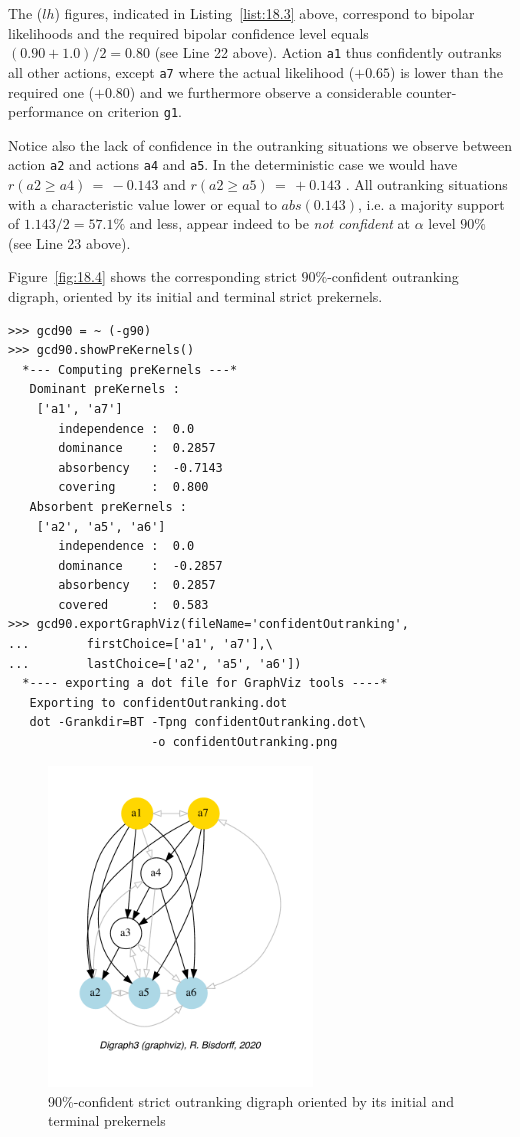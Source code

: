 The ($lh$) figures, indicated in Listing~\ref{list:18.3} above, correspond to bipolar likelihoods and the required bipolar confidence level equals $(0.90+1.0)/2 = 0.80$ (see Line 22 above). Action \texttt{a1} thus confidently outranks all other actions, except \texttt{a7} where the actual likelihood ($+0.65$) is lower than the required one ($+0.80$) and we furthermore observe a considerable counter-performance on criterion \texttt{g1}.

Notice also the lack of confidence in the outranking situations we observe between action \texttt{a2} and actions \texttt{a4} and \texttt{a5}. In the deterministic case we would have $r(a2 \geq a4) \,=\, -0.143$ and $r(a2 \geq a5) \,=\, +0.143$ . All outranking situations with a characteristic value lower or equal to $abs(0.143)$, i.e. a majority support of $1.143/2 = 57.1\%$ and less, appear indeed to be \emph{not confident} at $\alpha$ level $90\%$ (see Line 23 above).

Figure~\vref{fig:18.4} shows the corresponding strict $90\%$-confident outranking digraph, oriented by its initial and terminal strict prekernels.
\begin{lstlisting}
>>> gcd90 = ~ (-g90)
>>> gcd90.showPreKernels()
  *--- Computing preKernels ---*
   Dominant preKernels :
    ['a1', 'a7']
       independence :  0.0
       dominance    :  0.2857
       absorbency   :  -0.7143
       covering     :  0.800
   Absorbent preKernels :
    ['a2', 'a5', 'a6']
       independence :  0.0
       dominance    :  -0.2857
       absorbency   :  0.2857
       covered      :  0.583
>>> gcd90.exportGraphViz(fileName='confidentOutranking',
...        firstChoice=['a1', 'a7'],\
...        lastChoice=['a2', 'a5', 'a6'])
  *---- exporting a dot file for GraphViz tools ----*
   Exporting to confidentOutranking.dot
   dot -Grankdir=BT -Tpng confidentOutranking.dot\
                    -o confidentOutranking.png
\end{lstlisting}
\begin{figure}[ht]
\sidecaption[t]
\includegraphics[width=7cm]{Figures/18-4-confidentOutranking.pdf}
\caption{90\%-confident strict outranking digraph oriented by its initial and terminal prekernels}
\label{fig:18.4}       %
\end{figure}

